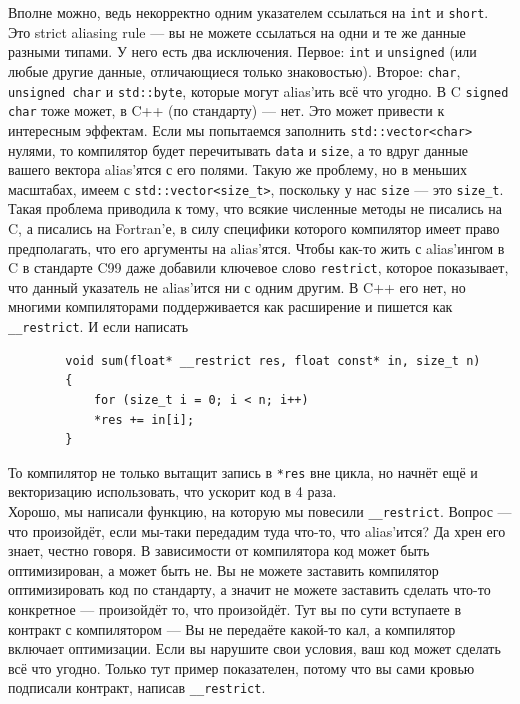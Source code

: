 \documentclass{article}
\begin{document}
    Вполне можно, ведь некорректно одним указателем ссылаться на \texttt{int} и \texttt{short}. Это strict aliasing rule --- вы не можете ссылаться на одни и те же данные разными типами. У него есть два исключения. Первое: \texttt{int} и \texttt{unsigned} (или любые другие данные, отличающиеся только знаковостью). Второе: \texttt{char}, \texttt{unsigned char} и \texttt{std::byte}, которые могут alias'ить всё что угодно. В C \texttt{signed char} тоже может, в C++ (по стандарту) --- нет. Это может привести к интересным эффектам. Если мы попытаемся заполнить \texttt{std::vector<char>} нулями, то компилятор будет перечитывать \texttt{data} и \texttt{size}, а то вдруг данные вашего вектора alias'ятся с его полями. Такую же проблему, но в меньших масштабах, имеем с \texttt{std::vector<size_t>}, поскольку у нас \texttt{size} --- это \texttt{size_t}.\\
    Такая проблема приводила к тому, что всякие численные методы не писались на C, а писались на Fortran'е, в силу специфики которого компилятор имеет право предполагать, что его аргументы на alias'ятся. Чтобы как-то жить с alias'ингом в C в стандарте C99 даже добавили ключевое слово \texttt{restrict}, которое показывает, что данный указатель не alias'ится ни с одним другим. В C++ его нет, но многими компиляторами поддерживается как расширение и пишется как \texttt{__restrict}. И если написать
    \begin{verbatim}
        void sum(float* __restrict res, float const* in, size_t n)
        {
            for (size_t i = 0; i < n; i++)
            *res += in[i];
        }
    \end{verbatim}
    То компилятор не только вытащит запись в \texttt{*res} вне цикла, но начнёт ещё и векторизацию использовать, что ускорит код в 4 раза.\\
    Хорошо, мы написали функцию, на которую мы повесили \texttt{__restrict}. Вопрос --- что произойдёт, если мы-таки передадим туда что-то, что alias'ится? Да хрен его знает, честно говоря. В зависимости от компилятора код может быть оптимизирован, а может быть не. Вы не можете заставить компилятор оптимизировать код по стандарту, а значит не можете заставить сделать что-то конкретное --- произойдёт то, что произойдёт. Тут вы по сути вступаете в контракт с компилятором --- Вы не передаёте какой-то кал, а компилятор включает оптимизации. Если вы нарушите свои условия, ваш код может сделать всё что угодно. Только тут пример показателен, потому что вы сами кровью подписали контракт, написав \texttt{__restrict}.
\end{document}
